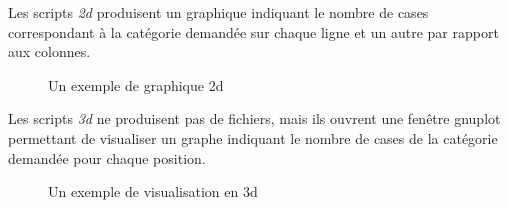 \documentclass[10pt,a4paper]{report}
\begin{document}
Les scripts \emph{2d} produisent un graphique indiquant le nombre de cases
correspondant à la catégorie demandée sur chaque ligne et un autre par rapport
aux colonnes. 

\begin{figure}[H]
  \caption{\label{fig:2d_graph} Un exemple de graphique 2d}
\end{figure}


Les scripts \emph{3d} ne produisent pas de fichiers, mais ils ouvrent une
fenêtre gnuplot permettant de visualiser un graphe indiquant le nombre de cases
de la catégorie demandée pour chaque position. 

\begin{figure}[H]
  \caption{\label{fig:3d_graph} Un exemple de visualisation en 3d}
\end{figure}
\end{document}
